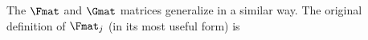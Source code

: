The $\Fmat$ and $\Gmat$ matrices generalize in a similar way.
The original definition of $\Fmat_j$ (in its most useful form) is